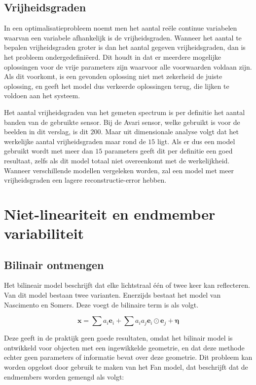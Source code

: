 \documentclass[12pt]{report}
\begin{document}
\section{Vrijheidsgraden} \label{sec:vrij}

In een optimalisatieprobleem noemt men het aantal re\"ele continue variabelen waarvan een variabele afhankelijk is de vrijheidsgraden. Wanneer het aantal te bepalen vrijheidsgraden groter is dan het aantal gegeven vrijheidsgraden, dan is het probleem ondergedefini\"eerd. Dit houdt in dat er meerdere mogelijke oplossingen voor de vrije parameters zijn waarvoor alle voorwaarden voldaan zijn. Als dit voorkomt, is een gevonden oplossing niet met zekerheid de juiste oplossing, en geeft het model dus verkeerde oplossingen terug, die lijken te voldoen aan het systeem.

Het aantal vrijheidsgraden van het gemeten spectrum is per definitie het aantal banden van de gebruikte sensor. Bij de Avari sensor, welke gebruikt is voor de beelden in dit verslag, is dit $200$. Maar uit dimensionale analyse volgt dat het werkelijke aantal vrijheidsgraden maar rond de $15$ ligt. Als er dus een model gebruikt wordt met meer dan $15$ parameters geeft dit per definitie een goed resultaat, zelfs als dit model totaal niet overeenkomt met de werkelijkheid. Wanneer verschillende modellen vergeleken worden, zal een model met meer vrijheidsgraden een lagere reconstructie-error hebben. 

\chapter{Niet-lineariteit en endmember variabiliteit} 

\section{Bilinair ontmengen}

Het bilineair model beschrijft dat elke lichtstraal \'e\'en of twee keer kan reflecteren. Van dit model bestaan twee varianten. Enerzijds bestaat het model van Nascimento en Somers\cite{mlinmix}. Deze voegt de bilinaire term is als volgt.

\begin{equation}
\bm{x} = \sum a_i \bm{e}_i + \sum a_i a_j \bm{e}_i \odot \bm{e}_j + \bm{\eta}
\end{equation}

Deze geeft in de praktijk geen goede resultaten, omdat het bilinair model is ontwikkeld voor objecten met een ingewikkelde geometrie, en dat deze methode echter geen parameters of informatie bevat over deze geometrie. Dit probleem kan worden opgelost door gebruik te maken van het Fan model\cite{mlinmix}, dat beschrijft dat de endmembers worden gemengd als volgt:
\end{document}
